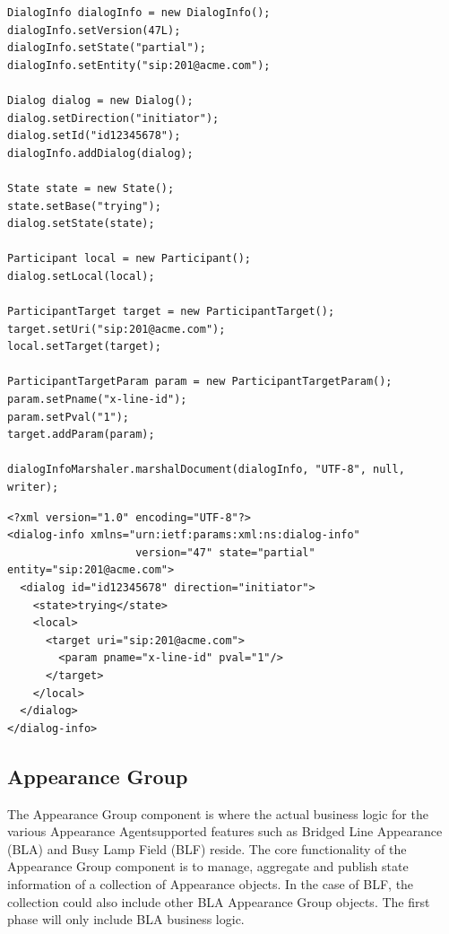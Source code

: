 \documentclass[twoside,11pt]{article}
\newcommand{\PAA}{Appearance Agent\space}
\begin{document}
\begin{lstlisting}[float,captionpos=b,caption=Creation of basic dialog-info,label=dialoginfoCode]
DialogInfo dialogInfo = new DialogInfo();
dialogInfo.setVersion(47L);
dialogInfo.setState("partial");
dialogInfo.setEntity("sip:201@acme.com");

Dialog dialog = new Dialog();
dialog.setDirection("initiator");
dialog.setId("id12345678");
dialogInfo.addDialog(dialog);

State state = new State();
state.setBase("trying");
dialog.setState(state);

Participant local = new Participant();
dialog.setLocal(local);

ParticipantTarget target = new ParticipantTarget();
target.setUri("sip:201@acme.com");
local.setTarget(target);

ParticipantTargetParam param = new ParticipantTargetParam();
param.setPname("x-line-id");
param.setPval("1");
target.addParam(param);

dialogInfoMarshaler.marshalDocument(dialogInfo, "UTF-8", null, writer);
\end{lstlisting}

\begin{lstlisting}[float,captionpos=b,caption=Results of marshaled DialogInfo instance,label=dialoginfoXML]
<?xml version="1.0" encoding="UTF-8"?>
<dialog-info xmlns="urn:ietf:params:xml:ns:dialog-info"
                    version="47" state="partial" entity="sip:201@acme.com">
  <dialog id="id12345678" direction="initiator">
    <state>trying</state>
    <local>
      <target uri="sip:201@acme.com">
        <param pname="x-line-id" pval="1"/>
      </target>
    </local>
  </dialog>
</dialog-info>
\end{lstlisting}

\subsection{Appearance Group}
The Appearance Group component is where the actual business logic for the various \PAA supported
features such as Bridged Line Appearance (BLA) and Busy Lamp Field (BLF) reside.  The core
functionality of the Appearance Group component is to manage, aggregate and publish state
information of a collection of Appearance objects.  In the case of BLF, the collection could also
include other BLA Appearance Group objects.  The first phase will only include BLA business logic.
\end{document}
